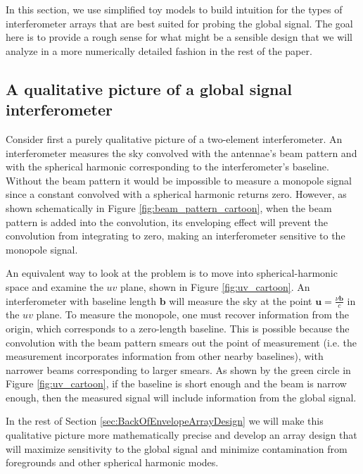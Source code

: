 \documentclass[twolcolumn,apj,iop,numberedappendix]{emulateapj}
\def\b{\mathbf{b}}
\begin{document}
In this section, we use simplified toy models to build intuition for the types of interferometer arrays that are best suited for probing the global signal.  The goal here is to provide a rough sense for what might be a sensible design that we will analyze in a more numerically detailed fashion in the rest of the paper.

\subsection{A qualitative picture of a global signal interferometer}

Consider first a purely qualitative picture of a two-element interferometer. An interferometer measures the sky convolved with the antennae's beam pattern and with the spherical harmonic corresponding to the interferometer's baseline. Without the beam pattern it would be impossible to measure a monopole signal since a constant convolved with a spherical harmonic returns zero. However, as shown schematically in Figure \ref{fig:beam_pattern_cartoon}, when the beam pattern is added into the convolution, its enveloping effect will prevent the convolution from integrating to zero, making an interferometer sensitive to the monopole signal. 

An equivalent way to look at the problem is to move into spherical-harmonic space and examine the $uv$ plane, shown in Figure \ref{fig:uv_cartoon}. An interferometer with baseline length $\b$ will measure the sky at the point $\mathbf{u} = \frac{\nu\b}{c}$ in the $uv$ plane. To measure the monopole, one must recover information from the origin, which corresponds to a zero-length baseline. This is possible because the convolution with the beam pattern smears out the point of measurement (i.e. the measurement incorporates information from other nearby baselines), with narrower beams corresponding to larger smears. As shown by the green circle in Figure \ref{fig:uv_cartoon}, if the baseline is short enough and the beam is narrow enough, then the measured signal will include information from the global signal. 

In the rest of Section \ref{sec:BackOfEnvelopeArrayDesign} we will make this qualitative picture more mathematically precise and develop an array design that will maximize sensitivity to the global signal and minimize contamination from foregrounds and other spherical harmonic modes. 
 
\end{document}
